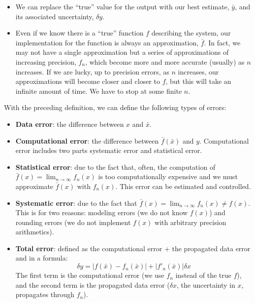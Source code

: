 \documentclass[justified, sixbynine]{tufte-book}
\theoremstyle{plain}%
\newtheorem * {corollary}{Corollary}
\theoremstyle{definition}
\theoremstyle{remark}
\newtheorem * {remark}{Remark}
\newtheorem * {note}{Note}
\begin{document}
\begin{fullwidth}
\begin{itemize}
\item We can replace the ``true'' value for the output with our best estimate, $\bar y$, and its associated uncertainty, $\delta y$.

\item Even if we know there is a ``true'' function $f$ describing the system, our implementation for the function is always an approximation, $\bar f$. In fact,  we may not have a single approximation but a series of approximations of increasing precision, $f_n$, which become more and more accurate (usually) as $n$ increases. If we are lucky, up to precision errors, as $n$ increases, our approximations will become closer and closer to $f$, but this will take an infinite amount of time. We have to stop at some finite $n$.
\end{itemize}


With the preceding definition, we can define the following types of errors:

\begin{itemize}
\item {\bf Data error}: the difference between $x$ and $\bar x$.

\item {\bf Computational error}: the difference between $\bar f(\bar x)$ and $y$.
Computational error includes two parts systematic error and statistical error.

\item {\bf Statistical error}: due to the fact that, often, the computation of $\bar f(x) = \lim_{n\rightarrow\infty} f_n(x)$ is too computationally expensive and we must approximate $\bar f(x)$ with $f_n(x)$. This error can be estimated and controlled.

\item {\bf Systematic error}: due to the fact that $\bar f(x) = \lim_{n\rightarrow\infty} f_n(x) \neq f(x)$. This is for two reasons: modeling errors (we do not know $f(x)$) and rounding errors (we do not implement $f(x)$ with arbitrary precision arithmetics).

\item {\bf Total error}: defined as the computational error + the propagated data error and in a formula:
\begin{equation}
\delta y = |f(\bar x)-f_n(\bar x)| + |f'_n(\bar x)|\delta x
\end{equation}
The first term is the computational error (we use $f_n$ instead of the true $f$), and the second term is the propagated data error ($\delta x$, the uncertainty in $x$, propagates through $f_n$).
\end{itemize}


\end{fullwidth}
\end{document}
